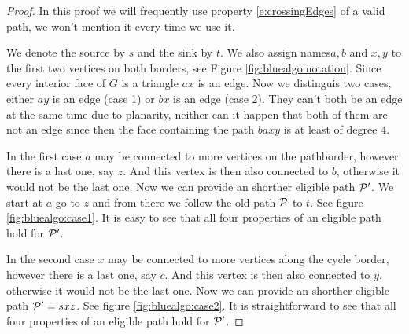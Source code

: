 \begin{proof}
In this proof we will frequently use property \ref{e:crossingEdges} of a valid path, we won't mention it every time we use it.

We denote the source by $s$ and the sink by $t$. We also assign names$a, b$ and $x, y$ to the first two vertices on both borders, see Figure \ref{fig:bluealgo:notation}. Since every interior face of $G$ is a triangle $ax$ is an edge. Now we distinguis two cases, either $ay$ is an edge (case 1) or $bx$ is an edge (case 2). They can't both be an edge at the same time due to planarity, neither can it happen that both of them are not an edge since then the face containing the path $baxy$ is at least of degree $4$.

In the first case $a$ may be connected to more vertices on the pathborder, however there is a last one, say $z$. And this vertex is then also connected to $b$, otherwise it would not be the last one. Now we can provide an shorther eligible path $\P'$. We start at $a$ go to $z$ and from there we follow the old path $\P$ to $t$.  See figure \ref{fig:bluealgo:case1}. It is easy to see that all four properties of an eligible path hold for $\P'$.

In the second case $x$ may be connected to more vertices along the cycle border, however there is a last one, say $c$. And this vertex is then also connected to $y$, otherwise it would not be the last one. Now we can provide an shorther eligible path $\P' = sxz$.   See figure \ref{fig:bluealgo:case2}. It is straightforward to see that all four properties of an eligible path hold for $\P'$. %
\end{proof}

